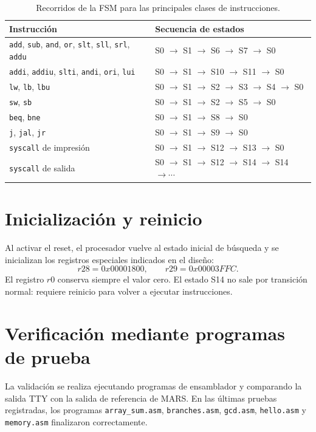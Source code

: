 \documentclass[11pt,a4paper]{article}
\begin{document}
\begin{table}[H]
\centering
\begin{tabularx}{\textwidth}{lX}
\toprule
\textbf{Instrucción} & \textbf{Secuencia de estados} \\
\midrule
\texttt{add}, \texttt{sub}, \texttt{and}, \texttt{or}, \texttt{slt}, \texttt{sll}, \texttt{srl}, \texttt{addu} & S0 $\to$ S1 $\to$ S6 $\to$ S7 $\to$ S0 \\
\texttt{addi}, \texttt{addiu}, \texttt{slti}, \texttt{andi}, \texttt{ori}, \texttt{lui} & S0 $\to$ S1 $\to$ S10 $\to$ S11 $\to$ S0 \\
\texttt{lw}, \texttt{lb}, \texttt{lbu} & S0 $\to$ S1 $\to$ S2 $\to$ S3 $\to$ S4 $\to$ S0 \\
\texttt{sw}, \texttt{sb} & S0 $\to$ S1 $\to$ S2 $\to$ S5 $\to$ S0 \\
\texttt{beq}, \texttt{bne} & S0 $\to$ S1 $\to$ S8 $\to$ S0 \\
\texttt{j}, \texttt{jal}, \texttt{jr} & S0 $\to$ S1 $\to$ S9 $\to$ S0 \\
\texttt{syscall} de impresión & S0 $\to$ S1 $\to$ S12 $\to$ S13 $\to$ S0 \\
\texttt{syscall} de salida & S0 $\to$ S1 $\to$ S12 $\to$ S14 $\to$ S14 $\to\cdots$ \\
\bottomrule
\end{tabularx}
\caption{Recorridos de la FSM para las principales clases de instrucciones.}
\end{table}

\section{Inicialización y reinicio}

Al activar el reset, el procesador vuelve al estado inicial de búsqueda y se inicializan los registros especiales indicados en el diseño:
\[
  r28 = 0x00001800,\qquad r29 = 0x00003FFC.
\]
El registro $r0$ conserva siempre el valor cero. El estado S14 no sale por transición normal: requiere reinicio para volver a ejecutar instrucciones.

\section{Verificación mediante programas de prueba}

La validación se realiza ejecutando programas de ensamblador y comparando la salida TTY con la salida de referencia de MARS. En las últimas pruebas registradas, los programas \texttt{array\_sum.asm}, \texttt{branches.asm}, \texttt{gcd.asm}, \texttt{hello.asm} y \texttt{memory.asm} finalizaron correctamente.
\end{document}
